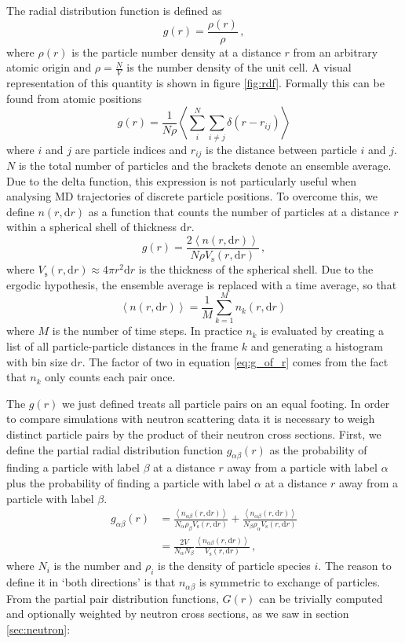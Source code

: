 The radial distribution function is defined as
%
\[ g(r) = \frac{\rho(r)}{\rho} \, , \]
%
where $\rho(r)$ is the particle number density at a distance $r$ from an arbitrary atomic origin and $\rho = \frac{N}{V}$ is the number density of the unit cell. A visual representation of this quantity is shown in figure \ref{fig:rdf}. Formally this can be found from atomic positions
%
\[ g(r) = \frac{1}{N\rho} \left\langle \sum_i^N \sum_{i \neq j} \delta(r - r_{ij})  \right\rangle \]
%
where $i$ and $j$ are particle indices and $r_{ij}$ is the distance between particle $i$ and $j$. $N$ is the total number of particles and the brackets denote an ensemble average. Due to the delta function, this expression is not particularly useful when analysing MD trajectories of discrete particle positions. To overcome this, we define $n(r,\mathrm{d}r)$ as a function that counts the number of particles at a distance $r$ within a spherical shell of thickness $\mathrm{d}r$.
%
\begin{equation}\label{eq:g_of_r}
g(r) = \frac{2 \left\langle n(r,\mathrm{d}r) \right\rangle}{N \rho V_\text{s}(r,\mathrm{d}r)} \, ,
\end{equation}
%
where $V_\text{s}(r,\mathrm{d}r) \approx 4 \pi r^2 \mathrm{d}r$ is the thickness of the spherical shell. Due to the ergodic hypothesis, the ensemble average is replaced with a time average, so that 
%
\[ \left\langle n(r,\mathrm{d}r) \right\rangle = \frac{1}{M} \sum_{k=1}^M n_k(r,\mathrm{d}r) \, \]
%
where $M$ is the number of time steps. In practice $n_k$ is evaluated by creating a list of all particle-particle distances in the frame $k$ and generating a histogram with bin size $\mathrm{d}r$. The factor of two in equation \eqref{eq:g_of_r} comes from the fact that $n_k$ only counts each pair once.

The $g(r)$ we just defined treats all particle pairs on an equal footing. In order to compare simulations with neutron scattering data it is necessary to weigh distinct particle pairs by the product of their neutron cross sections. First, we define the partial radial distribution function $g_{\alpha\beta}(r)$ as the probability of finding a particle with label $\beta$ at a distance $r$ away from a particle with label $\alpha$ plus the probability of finding a particle with label $\alpha$ at a distance $r$ away from a particle with label $\beta$.
%
\begin{align*}
g_{\alpha\beta}(r) &= \frac{ \left\langle n_{\alpha\beta}(r,\mathrm{d}r) \right\rangle}{N_\alpha  \rho_\beta V_\text{s}(r,\mathrm{d}r)} + \frac{ \left\langle n_{\alpha\beta}(r,\mathrm{d}r) \right\rangle}{N_\beta \rho_\alpha V_\text{s}(r,\mathrm{d}r)} \\
&= \frac{2V}{N_\alpha N_\beta} \frac{ \left\langle n_{\alpha\beta}(r,\mathrm{d}r) \right\rangle}{V_\text{s}(r,\mathrm{d}r)} \, ,
\end{align*}
%
where $N_i$ is the number and $\rho_i$ is the density of particle species $i$. The reason to define it in `both directions' is that $n_{\alpha\beta}$ is symmetric to exchange of particles. From the partial pair distribution functions, $G(r)$ can be trivially computed and optionally weighted by neutron cross sections, as we saw in section \ref{sec:neutron}:

